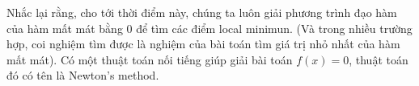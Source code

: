  
Nhắc lại rằng, cho tới thời điểm này, chúng ta luôn giải phương trình đạo hàm của hàm mất mát bằng 0 để tìm các điểm local minimun. (Và trong nhiều trường hợp, coi nghiệm tìm được là nghiệm của bài toán tìm giá trị nhỏ nhất của hàm mất mát). Có một thuật toán nối tiếng giúp giải bài toán $f(x) = 0$, thuật toán đó có tên là Newton's method. 
 
 
 
 
 
 
 
 
 
 
 
 
